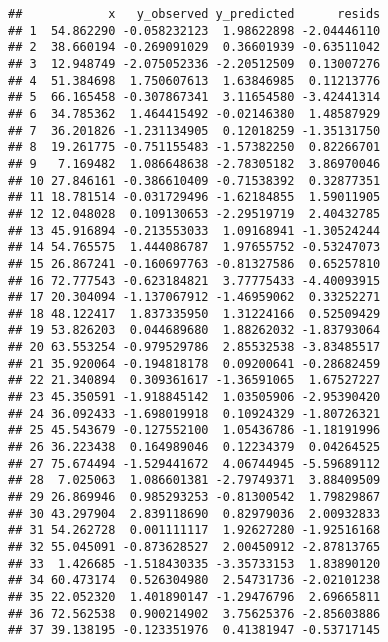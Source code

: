 \documentclass[
]{article}
\newenvironment{Shaded}{\begin{snugshade}}{\end{snugshade}}
\newcommand{\NormalTok}[1]{#1}
\newcommand{\OtherTok}[1]{\textcolor[rgb]{0.56,0.35,0.01}{#1}}
\newcommand{\SpecialCharTok}[1]{\textcolor[rgb]{0.00,0.00,0.00}{#1}}
\begin{document}
\begin{Shaded}
\end{Shaded}

\begin{verbatim}
##            x   y_observed y_predicted      resids
## 1  54.862290 -0.058232123  1.98622898 -2.04446110
## 2  38.660194 -0.269091029  0.36601939 -0.63511042
## 3  12.948749 -2.075052336 -2.20512509  0.13007276
## 4  51.384698  1.750607613  1.63846985  0.11213776
## 5  66.165458 -0.307867341  3.11654580 -3.42441314
## 6  34.785362  1.464415492 -0.02146380  1.48587929
## 7  36.201826 -1.231134905  0.12018259 -1.35131750
## 8  19.261775 -0.751155483 -1.57382250  0.82266701
## 9   7.169482  1.086648638 -2.78305182  3.86970046
## 10 27.846161 -0.386610409 -0.71538392  0.32877351
## 11 18.781514 -0.031729496 -1.62184855  1.59011905
## 12 12.048028  0.109130653 -2.29519719  2.40432785
## 13 45.916894 -0.213553033  1.09168941 -1.30524244
## 14 54.765575  1.444086787  1.97655752 -0.53247073
## 15 26.867241 -0.160697763 -0.81327586  0.65257810
## 16 72.777543 -0.623184821  3.77775433 -4.40093915
## 17 20.304094 -1.137067912 -1.46959062  0.33252271
## 18 48.122417  1.837335950  1.31224166  0.52509429
## 19 53.826203  0.044689680  1.88262032 -1.83793064
## 20 63.553254 -0.979529786  2.85532538 -3.83485517
## 21 35.920064 -0.194818178  0.09200641 -0.28682459
## 22 21.340894  0.309361617 -1.36591065  1.67527227
## 23 45.350591 -1.918845142  1.03505906 -2.95390420
## 24 36.092433 -1.698019918  0.10924329 -1.80726321
## 25 45.543679 -0.127552100  1.05436786 -1.18191996
## 26 36.223438  0.164989046  0.12234379  0.04264525
## 27 75.674494 -1.529441672  4.06744945 -5.59689112
## 28  7.025063  1.086601381 -2.79749371  3.88409509
## 29 26.869946  0.985293253 -0.81300542  1.79829867
## 30 43.297904  2.839118690  0.82979036  2.00932833
## 31 54.262728  0.001111117  1.92627280 -1.92516168
## 32 55.045091 -0.873628527  2.00450912 -2.87813765
## 33  1.426685 -1.518430335 -3.35733153  1.83890120
## 34 60.473174  0.526304980  2.54731736 -2.02101238
## 35 22.052320  1.401890147 -1.29476796  2.69665811
## 36 72.562538  0.900214902  3.75625376 -2.85603886
## 37 39.138195 -0.123351976  0.41381947 -0.53717145

\end{verbatim}
\end{document}
